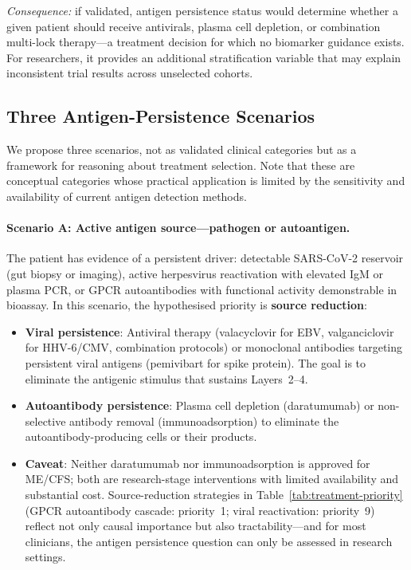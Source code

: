 \textit{Consequence:} if validated, antigen persistence status would determine whether a given patient should receive antivirals, plasma cell depletion, or combination multi-lock therapy---a treatment decision for which no biomarker guidance exists. For researchers, it provides an additional stratification variable that may explain inconsistent trial results across unselected cohorts.

\subsection{Three Antigen-Persistence Scenarios}

We propose three scenarios, not as validated clinical categories but as a framework for reasoning about treatment selection. Note that these are conceptual categories whose practical application is limited by the sensitivity and availability of current antigen detection methods.

\paragraph{Scenario A: Active antigen source---pathogen or autoantigen.} The patient has evidence of a persistent driver: detectable SARS-CoV-2 reservoir (gut biopsy or imaging), active herpesvirus reactivation with elevated IgM or plasma PCR, or GPCR autoantibodies with functional activity demonstrable in bioassay. In this scenario, the hypothesised priority is \textbf{source reduction}:

\begin{itemize}
    \item \textbf{Viral persistence}: Antiviral therapy (valacyclovir for EBV, valganciclovir for HHV-6/CMV, combination protocols) or monoclonal antibodies targeting persistent viral antigens (pemivibart for spike protein). The goal is to eliminate the antigenic stimulus that sustains Layers~2--4.
    \item \textbf{Autoantibody persistence}: Plasma cell depletion (daratumumab) or non-selective antibody removal (immunoadsorption) to eliminate the autoantibody-producing cells or their products.
    \item \textbf{Caveat}: Neither daratumumab nor immunoadsorption is approved for ME/CFS; both are research-stage interventions with limited availability and substantial cost. Source-reduction strategies in Table~\ref{tab:treatment-priority} (GPCR autoantibody cascade: priority~1; viral reactivation: priority~9) reflect not only causal importance but also tractability---and for most clinicians, the antigen persistence question can only be assessed in research settings.
\end{itemize}

